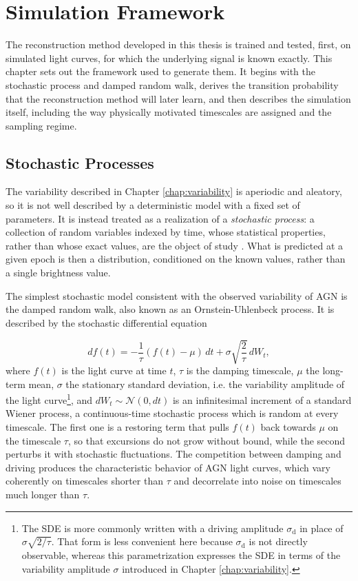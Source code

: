 \chapter{Simulation Framework}
\label{chap:simulation}

The reconstruction method developed in this thesis is trained and tested, first, on simulated light curves, for which the underlying signal is known exactly. This chapter sets out the framework used to generate them. It begins with the stochastic process and damped random walk, derives the transition probability that the reconstruction method will later learn, and then describes the simulation itself, including the way physically motivated timescales are assigned and the sampling regime.

\section{Stochastic Processes}
\label{sec:stochastic}

The variability described in Chapter \ref{chap:variability} is aperiodic and aleatory, so it is not well described by a deterministic model with a fixed set of parameters. It is instead treated as a realization of a \textit{stochastic process}: a collection of random variables indexed by time, whose statistical properties, rather than whose exact values, are the object of study \parencite{Ross1995StochasticP}. What is predicted at a given epoch is then a distribution, conditioned on the known values, rather than a single brightness value.

The simplest stochastic model consistent with the observed variability of AGN is the damped random walk, also known as an Ornstein-Uhlenbeck process. It is described by the stochastic differential equation

\begin{equation}
    df(t) = -\frac{1}{\tau}(f(t) - \mu)\,dt + \sigma\sqrt{\frac{2}{\tau}}\,dW_t,
    \label{eq:drw_sde}
\end{equation}
where $f(t)$ is the light curve at time $t$, $\tau$ is the damping timescale, $\mu$ the long-term mean, $\sigma$ the stationary standard deviation, i.e. the variability amplitude of the light curve\footnote{The SDE is more commonly written with a driving amplitude $\sigma_\mathrm{d}$ in place of $\sigma\sqrt{2/\tau}$. That form is less convenient here because $\sigma_\mathrm{d}$ is not directly observable, whereas this parametrization expresses the SDE in terms of the variability amplitude $\sigma$ introduced in Chapter \ref{chap:variability}.}, and $dW_t \sim \mathcal{N}(0, dt)$ is an infinitesimal increment of a standard Wiener process, a continuous-time stochastic process which is random at every timescale. The first one is a restoring term that pulls $f(t)$ back towards $\mu$ on the timescale $\tau$, so that excursions do not grow without bound, while the second perturbs it with stochastic fluctuations. The competition between damping and driving produces the characteristic behavior of AGN light curves, which vary coherently on timescales shorter than $\tau$ and decorrelate into noise on timescales much longer than $\tau$. 

